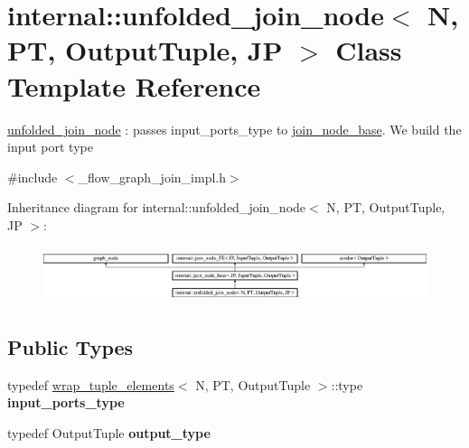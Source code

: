 \hypertarget{classinternal_1_1unfolded__join__node}{}\section{internal\+:\+:unfolded\+\_\+join\+\_\+node$<$ N, P\+T, Output\+Tuple, J\+P $>$ Class Template Reference}
\label{classinternal_1_1unfolded__join__node}


\hyperlink{classinternal_1_1unfolded__join__node}{unfolded\+\_\+join\+\_\+node} \+: passes input\+\_\+ports\+\_\+type to \hyperlink{classinternal_1_1join__node__base}{join\+\_\+node\+\_\+base}. We build the input port type  




{\ttfamily \#include $<$\+\_\+flow\+\_\+graph\+\_\+join\+\_\+impl.\+h$>$}

Inheritance diagram for internal\+:\+:unfolded\+\_\+join\+\_\+node$<$ N, P\+T, Output\+Tuple, J\+P $>$\+:\begin{figure}[H]
\begin{center}
\leavevmode
\includegraphics[height=1.647059cm]{classinternal_1_1unfolded__join__node}
\end{center}
\end{figure}
\subsection*{Public Types}
\begin{DoxyCompactItemize}
\item 
\hypertarget{classinternal_1_1unfolded__join__node_aedc3def066ab8dc81d6a24de8864dfa6}{}typedef \hyperlink{structinternal_1_1wrap__tuple__elements}{wrap\+\_\+tuple\+\_\+elements}$<$ N, P\+T, Output\+Tuple $>$\+::type {\bfseries input\+\_\+ports\+\_\+type}\label{classinternal_1_1unfolded__join__node_aedc3def066ab8dc81d6a24de8864dfa6}

\item 
\hypertarget{classinternal_1_1unfolded__join__node_abf5abcf49d36fd99a27561a72c75c854}{}typedef Output\+Tuple {\bfseries output\+\_\+type}\label{classinternal_1_1unfolded__join__node_abf5abcf49d36fd99a27561a72c75c854}

\end{DoxyCompactItemize}

